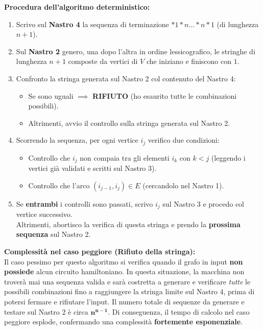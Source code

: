 \vspace{0.4cm}
\textbf{Procedura dell'algoritmo deterministico:}
\begin{enumerate}
    \item Scrivo sul \textbf{Nastro 4} la sequenza di terminazione \texttt{$\ast 1 \ast n \dots \ast n \ast 1$} (di lunghezza $n+1$).
    \item Sul \textbf{Nastro 2} genero, una dopo l'altra in ordine lessicografico, le stringhe di lunghezza $n+1$ composte da vertici di $V$ che iniziano e finiscono con $1$.
    \item Confronto la stringa generata sul Nastro 2 col contenuto del Nastro 4:
    \begin{itemize}
        \item Se sono uguali $\implies$ \textbf{RIFIUTO} (ho esaurito tutte le combinazioni possibili).
        \item Altrimenti, avvio il controllo sulla stringa generata sul Nastro 2.
    \end{itemize} 
    \item Scorrendo la sequenza, per ogni vertice $i_j$ verifico due condizioni:
    \begin{itemize}
        \item Controllo che $i_j$ non compaia tra gli elementi $i_k$ con $k<j$ (leggendo i vertici già validati e scritti sul Nastro 3).
        \item Controllo che l'arco $(i_{j-1}, i_j) \in E$ (cercandolo nel Nastro 1).
    \end{itemize}
    \item Se \textbf{entrambi} i controlli sono passati, scrivo $i_j$ sul Nastro 3 e procedo col vertice successivo. \\
    Altrimenti, abortisco la verifica di questa stringa e prendo la \textbf{prossima sequenza} sul Nastro 2.
\end{enumerate}

\vspace{0.4cm}

\textbf{Complessità nel caso peggiore (Rifiuto della stringa):} \\
Il caso pessimo per questo algoritmo si verifica quando il grafo in input \textbf{non possiede} alcun circuito hamiltoniano. In questa situazione, la macchina non troverà mai una sequenza valida e sarà costretta a generare e verificare \textit{tutte} le possibili combinazioni fino a raggiungere la stringa limite sul Nastro 4, prima di potersi fermare e rifiutare l'input.
Il numero totale di sequenze da generare e testare sul Nastro 2 è circa $\mathbf{n^{n-1}}$. Di conseguenza, il tempo di calcolo nel caso peggiore esplode, confermando una complessità \textbf{fortemente esponenziale}.

